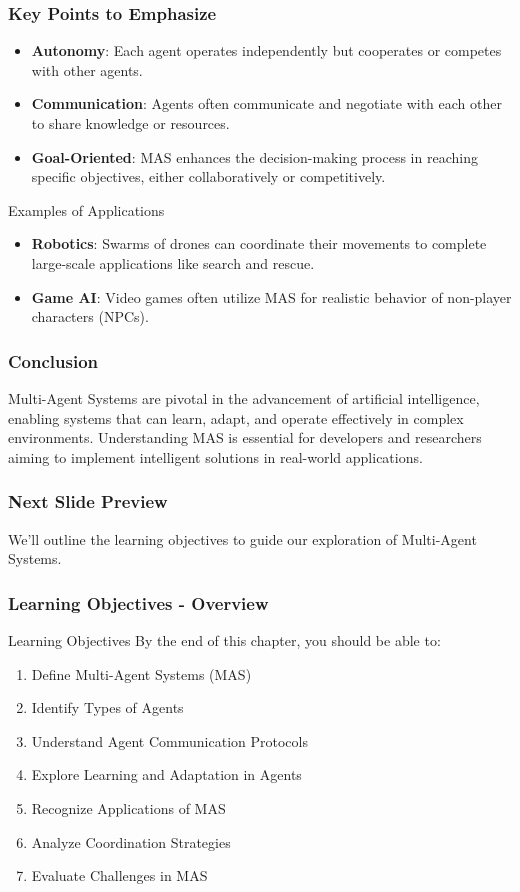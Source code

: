 \documentclass[aspectratio=169]{beamer}
\begin{document}
\begin{frame}[fragile]
    \frametitle{Key Points to Emphasize}
    \begin{itemize}
        \item \textbf{Autonomy}: Each agent operates independently but cooperates or competes with other agents.
        \item \textbf{Communication}: Agents often communicate and negotiate with each other to share knowledge or resources.
        \item \textbf{Goal-Oriented}: MAS enhances the decision-making process in reaching specific objectives, either collaboratively or competitively.
    \end{itemize}

    \begin{block}{Examples of Applications}
        \begin{itemize}
            \item \textbf{Robotics}: Swarms of drones can coordinate their movements to complete large-scale applications like search and rescue.
            \item \textbf{Game AI}: Video games often utilize MAS for realistic behavior of non-player characters (NPCs).
        \end{itemize}
    \end{block}
\end{frame}

\begin{frame}[fragile]
    \frametitle{Conclusion}
    Multi-Agent Systems are pivotal in the advancement of artificial intelligence, enabling systems that can learn, adapt, and operate effectively in complex environments.
    Understanding MAS is essential for developers and researchers aiming to implement intelligent solutions in real-world applications.
\end{frame}

\begin{frame}[fragile]
    \frametitle{Next Slide Preview}
    We'll outline the learning objectives to guide our exploration of Multi-Agent Systems.
\end{frame}

\begin{frame}[fragile]
    \frametitle{Learning Objectives - Overview}
    \begin{block}{Learning Objectives}
        By the end of this chapter, you should be able to:
    \end{block}
    \begin{enumerate}
        \item Define Multi-Agent Systems (MAS)
        \item Identify Types of Agents
        \item Understand Agent Communication Protocols
        \item Explore Learning and Adaptation in Agents
        \item Recognize Applications of MAS
        \item Analyze Coordination Strategies
        \item Evaluate Challenges in MAS
    \end{enumerate}
\end{frame}
\end{document}
